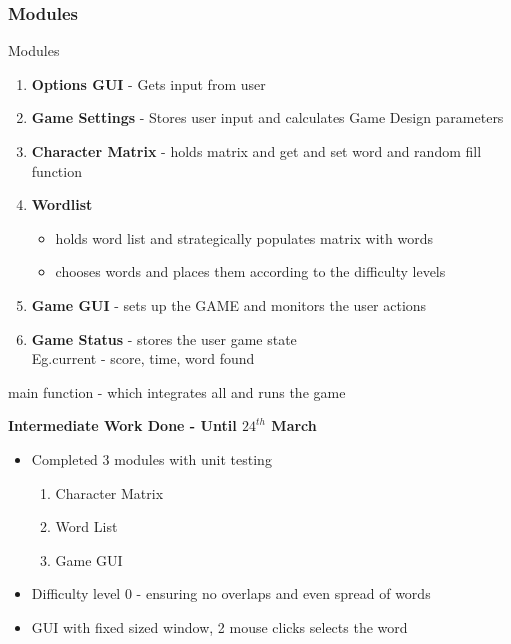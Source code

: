 \documentclass{beamer}
\begin{document}
\begin{frame}\frametitle {Modules}
\begin{block}{Modules}
\begin{enumerate} 
\item \textbf{Options GUI} - Gets input from user
\item \textbf{Game Settings} - Stores user input and calculates Game Design parameters 
\item \textbf{Character Matrix} - holds matrix and get and set word and random fill function
\item \textbf{Wordlist}
\begin{itemize} \item holds word list and strategically populates matrix with words  \item  chooses words and places them according to the difficulty levels \end{itemize}
\item \textbf{Game GUI} - sets up the GAME and monitors the user actions
\item \textbf{Game Status} - stores the user game state \\Eg.current - score, time, word found
\end{enumerate}
main function - which integrates all and runs the game
\end{block}
\end{frame}

\begin{frame}
\textbf{Intermediate Work Done - Until $24^{th}$ March}
\begin{itemize}
\item Completed 3 modules with unit testing
\begin{enumerate}
\item Character Matrix
\item Word List 
\item Game GUI
\end{enumerate}
\item Difficulty level 0 - ensuring no overlaps and even spread of words
\item GUI with fixed sized window, 2 mouse clicks selects the word  
 \end{itemize}
\end{frame}
\end{document}
